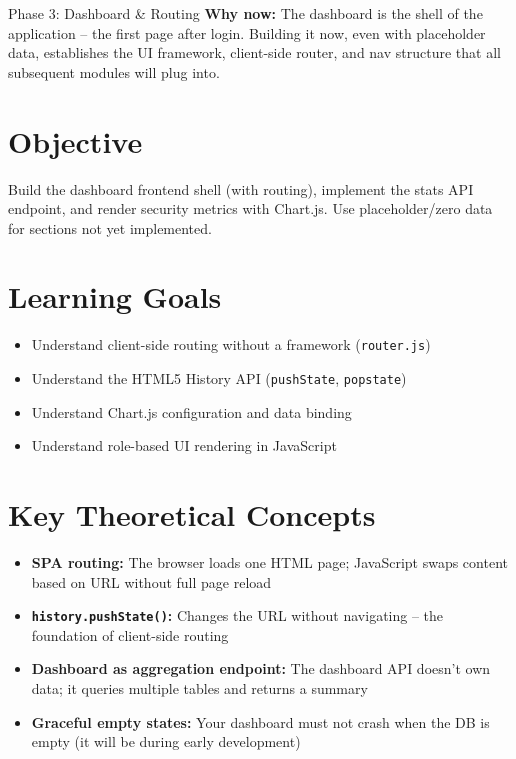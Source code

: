 \documentclass[11pt,a4paper]{report}
\newcommand{\filepath}[1]{\texttt{\small#1}}
\begin{document}
\begin{phasebox}{Phase 3: Dashboard \& Routing}
\textbf{Why now:} The dashboard is the shell of the application -- the first page after login. Building it now, even with placeholder data, establishes the UI framework, client-side router, and nav structure that all subsequent modules will plug into.
\end{phasebox}

\section*{Objective}
Build the dashboard frontend shell (with routing), implement the stats API endpoint, and render security metrics with Chart.js. Use placeholder/zero data for sections not yet implemented.

\section*{Learning Goals}
\begin{itemize}
    \item Understand client-side routing without a framework (\filepath{router.js})
    \item Understand the HTML5 History API (\texttt{pushState}, \texttt{popstate})
    \item Understand Chart.js configuration and data binding
    \item Understand role-based UI rendering in JavaScript
\end{itemize}

\section*{Key Theoretical Concepts}
\begin{itemize}
    \item \textbf{SPA routing:} The browser loads one HTML page; JavaScript swaps content based on URL without full page reload
    \item \textbf{\texttt{history.pushState()}:} Changes the URL without navigating -- the foundation of client-side routing
    \item \textbf{Dashboard as aggregation endpoint:} The dashboard API doesn't own data; it queries multiple tables and returns a summary
    \item \textbf{Graceful empty states:} Your dashboard must not crash when the DB is empty (it will be during early development)
\end{itemize}
\end{document}
